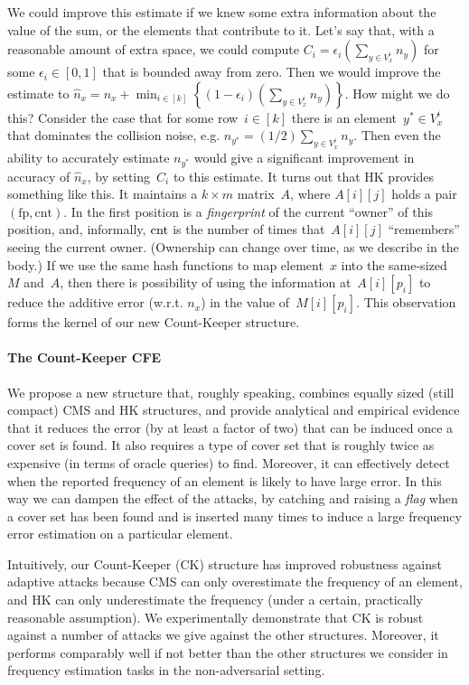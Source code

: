 We could improve this estimate if we knew some extra information about the value of the sum, or the elements that contribute to it. 
Let's say that, with a reasonable amount of extra space, we could compute $C_i = \epsilon_i \left(\sum_{y \in V^i_x }n_y\right)$ for some $\epsilon_i \in [0,1]$ that is bounded away from zero. Then we would improve the estimate to
$
\hat{n}_x = n_x + \min_{i \in [k]}\left\{(1-\epsilon_i)\left(\sum_{y \in V^i_x }n_y\right)\right\}
$.
How might we do this? Consider the case that for some row~$i \in [k]$ there is an element~$y^* \in V^{i}_{x}$ that dominates the collision noise, e.g. $n_{y^*} = (1/2)\sum_{y \in V^i_x }n_y$.  Then even the ability to accurately estimate $n_{y^*}$ would give a significant improvement in accuracy of $\hat{n}_x$, by setting~$C_i$ to this estimate. It turns out that HK provides something like this. It maintains a $k \times m$ matrix~$A$, where $A[i][j]$ holds a pair $(\mathrm{fp},\mathrm{cnt})$. In the first position is a \emph{fingerprint} of the current ``owner'' of this position, and, informally, $\textup{cnt}$ is the number of times that~$A[i][j]$ ``remembers'' seeing the current owner.  (Ownership can change over time, as we describe in the body.) If we use the same hash functions to map element~$x$ into the same-sized~$M$ and~$A$, then there is possibility of using the information at~$A[i][p_i]$ to reduce the additive error (w.r.t. $n_x$) in the value of~$M[i][p_i]$.  This observation forms the kernel of our new Count-Keeper structure.


\paragraph{The Count-Keeper CFE}

We propose a new structure that, roughly speaking, combines equally sized (still compact) CMS and HK structures, and provide analytical and empirical evidence that it reduces the error (by at least a factor of two) that can be induced once a cover set is found. It also requires a type of cover set that is roughly twice as expensive (in terms of oracle queries) to find. Moreover, it can effectively detect when the reported frequency of an element is likely to have large error. In this way we can dampen the effect of the attacks, by catching and raising a \emph{flag} when a cover set has been found and is inserted many times to induce a large frequency error estimation on a particular element.

Intuitively, our Count-Keeper (CK) structure has improved robustness against adaptive attacks because CMS can only overestimate the frequency of an element, and HK can only underestimate the frequency (under a certain, practically reasonable assumption). We experimentally demonstrate that CK is robust against a number of attacks we give against the other structures. Moreover, it performs comparably well if not better than the other structures we consider in frequency estimation tasks in the non-adversarial setting.

